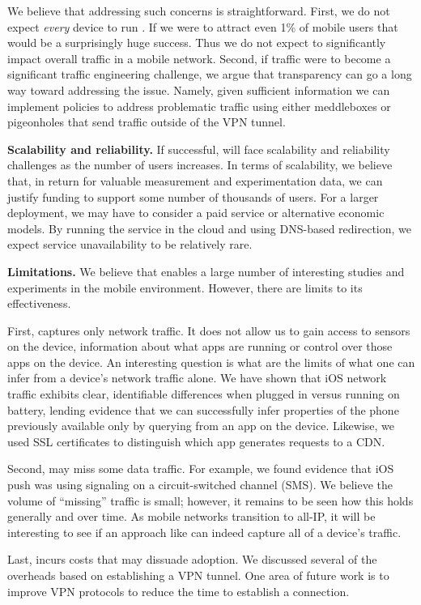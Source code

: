 We believe that addressing such concerns is straightforward. First, we do not 
expect \emph{every} device to run \meddle. If we were to attract even 1\% of 
mobile users that would be a surprisingly huge success. Thus we do not expect 
\meddle to significantly impact overall traffic in a mobile network. Second, if \meddle 
traffic were to become a significant traffic engineering challenge, we argue that 
transparency can go a long way toward addressing the issue. Namely, 
given sufficient information we can implement policies to address problematic traffic using either 
meddleboxes or pigeonholes that send traffic outside of the VPN 
tunnel. 

\noindent\textbf{Scalability and reliability.} If successful, \meddle will 
face scalability and reliability challenges as the number of users increases. 
In terms of scalability, we believe that, in return for valuable measurement and experimentation data, 
we can justify funding to support some number of thousands of users. For a 
larger deployment, we may have to consider a paid service or alternative 
economic models. By running the service in the cloud and using DNS-based 
redirection, we expect service unavailability to be relatively rare. 

\noindent\textbf{Limitations.} We believe that \meddle enables a large number 
of interesting studies and experiments in the mobile environment. However, 
there are limits to its effectiveness. 

First, \meddle captures only network traffic. It does 
not allow us to gain access to sensors on the device, information about what 
apps are running or control over those apps on the device. An interesting question 
is what are the limits of what one can infer from a device's network traffic alone. 
We have shown that iOS network traffic exhibits clear, identifiable differences 
when plugged in versus running on battery, lending evidence that we can successfully 
infer properties of the phone previously available only by querying from an app 
on the device. Likewise, we used SSL certificates to distinguish which app generates 
requests to a CDN.

Second, \meddle may miss some data traffic. For example, we found evidence that 
iOS push was using signaling on a circuit-switched channel (SMS). We believe 
the volume of ``missing'' traffic is small; however, it remains to be seen how 
this holds generally and over time. As mobile networks transition to all-IP, it will 
be interesting to see if an approach like \meddle can indeed capture all of a device's traffic.

Last, \meddle incurs costs that may dissuade adoption. We discussed several of the 
overheads based on establishing a VPN tunnel. One area of future work is to improve 
VPN protocols to reduce the time to establish a connection. 
